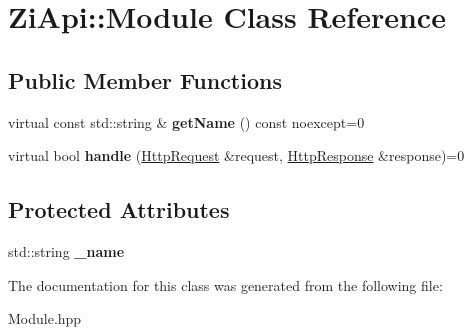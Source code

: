 \hypertarget{classZiApi_1_1Module}{}\section{Zi\+Api\+::Module Class Reference}
\label{classZiApi_1_1Module}
\subsection*{Public Member Functions}
\begin{DoxyCompactItemize}
\item 
\mbox{\label{classZiApi_1_1Module_a57b48f9d16a42034e2aa172df911e371}} 
virtual const std\+::string \& {\bfseries get\+Name} () const noexcept=0
\item 
\mbox{\label{classZiApi_1_1Module_a8e1af0267672de49770bd07fd96d8633}} 
virtual bool {\bfseries handle} (\mbox{\hyperlink{classZiApi_1_1HttpRequest}{Http\+Request}} \&request, \mbox{\hyperlink{classZiApi_1_1HttpResponse}{Http\+Response}} \&response)=0
\end{DoxyCompactItemize}
\subsection*{Protected Attributes}
\begin{DoxyCompactItemize}
\item 
\mbox{\label{classZiApi_1_1Module_a2b53b4057d16cabf14027f5fe777a147}} 
std\+::string {\bfseries \+\_\+name}
\end{DoxyCompactItemize}


The documentation for this class was generated from the following file\+:\begin{DoxyCompactItemize}
\item 
Module.\+hpp\end{DoxyCompactItemize}
